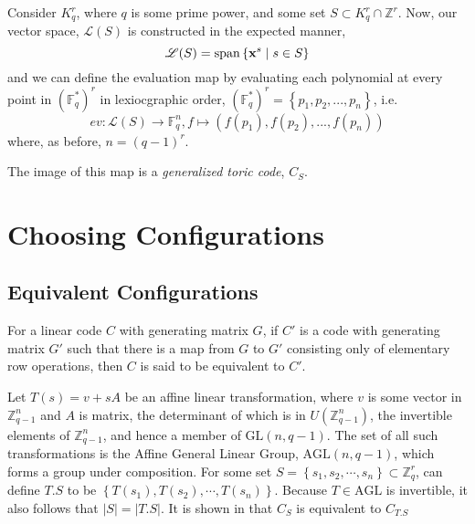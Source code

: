 \documentclass[12pt]{amsart}
\theoremstyle{plain}
\newcommand{\F}{\mathbb{F}}
\newcommand{\AT}{\mathbb{F}^*}
\newcommand{\Int}{\mathbb{Z}}
\newcommand{\GL}[2]{\mathrm{GL}\left(#1,#2\right)}
\newcommand{\AGL}[2]{\mathrm{AGL}\left(#1,#2\right)}
\DeclareMathOperator{\Span}{span}
\begin{document}
Consider $K_q^r$, where $q$ is some prime power, and some set $S \subset K_q^r \cap \Int^r$. Now, our vector space, $\mathscr{L}(S)$ is constructed in the expected manner,
\begin{equation*}
\mathscr{L}(S) = \Span \left\{\bold{x}^s \mid s \in S \right\}
\end{equation*}
and we can define the evaluation map by evaluating each polynomial at every point in $(\AT_q)^r$ in lexiocgraphic order, $(\F_q^*)^r = \left\{p_1,p_2,...,p_n\right\}$, i.e.
\begin{equation*}
ev: \mathscr{L}(S) \to \F_q^n, f \mapsto \left(f(p_1),f(p_2),...,f(p_n)\right)
\end{equation*}
where, as before, $n=(q-1)^r$.

The image of this map is a \emph{generalized toric code}, $C_S$.

\section{Choosing Configurations}
\subsection{Equivalent Configurations} 
For a linear code $C$ with generating matrix $G$, if $C'$ is a code with generating matrix $G'$ such that there is a map from $G$ to $G'$ consisting only of elementary row operations, then $C$ is said to be equivalent to $C'$.

Let $T(s) = v + sA$ be an affine linear transformation, where $v$ is some vector in $\Int_{q-1}^n$ and $A$ is matrix, the determinant of which is in $U(\Int_{q-1}^n)$, the invertible elements of $\Int_{q-1}^n$, and hence a member of $\GL{n}{q-1}$. The set of all such transformations is the Affine General Linear Group, $\AGL{n}{q-1}$, which forms a group under composition. For some set $S=\left\{s_1,s_2,\cdots,s_n\right\} \subset \Int_q^r$, can define $T.S$ to be $\left\{T(s_1),T(s_2),\cdots,T(s_n)\right\}$. Because $T \in \mathrm{AGL}$ is invertible, it also follows that $\vert S \vert = \vert T.S \vert$. It is shown in \cite{census1} that $C_S$ is equivalent to $C_{T.S}$
\end{document}

